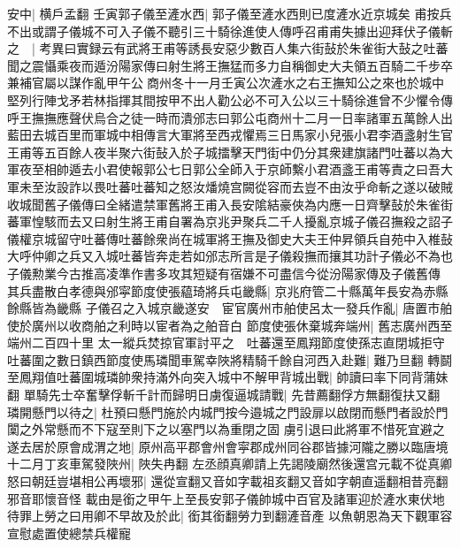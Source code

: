 安中|{
	横戶孟翻}
壬寅郭子儀至滻水西|{
	郭子儀至滻水西則已度滻水近京城矣}
甫按兵不出或謂子儀城不可入子儀不聽引三十騎徐進使人傳呼召甫甫失據出迎拜伏子儀斬之　|{
	考異曰實録云有武將王甫等誘長安惡少數百人集六街鼔於朱雀街大鼔之吐蕃聞之震懾乘夜而遁汾陽家傳曰射生將王撫猛而多力自稱御史大夫領五百騎二千步卒兼補官屬以謀作亂甲午公商州冬十一月壬寅公次滻水之右王撫知公之來也於城中堅列行陣戈矛若林指揮其間按甲不出人勸公必不可入公以三十騎徐進曾不少懼令傳呼王撫撫應聲伏烏合之徒一時而潰邠志曰郭公屯商州十二月一日率諸軍五萬餘人出藍田去城百里而軍城中相傳言大軍將至西戎懼焉三日馬家小兒張小君李酒盞射生官王甫等五百餘人夜半聚六街鼔入於子城擂擊天門街中仍分其衆建旗諸門吐蕃以為大軍夜至相帥遁去小君使報郭公七日郭公全師入于京師繫小君酒盞王甫等責之曰吾大軍未至汝設詐以畏吐蕃吐蕃知之怒汝燔燒宫闕從容而去豈不由汝乎命斬之遂以破賊收城聞舊子儀傳曰全緒遣禁軍舊將王甫入長安隂結豪俠為内應一日齊擊鼔於朱雀街蕃軍惶駭而去又曰射生將王甫自署為京兆尹聚兵二千人擾亂京城子儀召撫殺之詔子儀權京城留守吐蕃傳吐蕃餘衆尚在城軍將王撫及御史大夫王仲昇領兵自苑中入椎鼔大呼仲卿之兵又入城吐蕃皆奔走若如邠志所言是子儀殺撫而攘其功計子儀必不為也子儀勲業今古推高凌準作書多攻其短疑有宿嫌不可盡信今從汾陽家傳及子儀舊傳}
其兵盡散白孝德與邠寜節度使張藴琦將兵屯畿縣|{
	京兆府管二十縣萬年長安為赤縣餘縣皆為畿縣}
子儀召之入城京畿遂安　宦官廣州市舶使呂太一發兵作亂|{
	唐置市舶使於廣州以收商舶之利時以宦者為之舶音白}
節度使張休棄城奔端州|{
	舊志廣州西至端州二百四十里}
太一縱兵焚掠官軍討平之　吐蕃還至鳳翔節度使孫志直閉城拒守吐蕃圍之數日鎮西節度使馬璘聞車駕幸陜將精騎千餘自河西入赴難|{
	難乃旦翻}
轉鬬至鳳翔值吐蕃圍城璘帥衆持滿外向突入城中不解甲背城出戰|{
	帥讀曰率下同背蒲妹翻}
單騎先士卒奮擊俘斬千計而歸明日虜復逼城請戰|{
	先昔薦翻俘方無翻復扶又翻}
璘開懸門以待之|{
	杜預曰懸門施於内城門按今邉城之門設扉以啟閉而懸門者設於門闑之外常懸而不下寇至則下之以塞門以為重閉之固}
虜引退曰此將軍不惜死宜避之遂去居於原會成渭之地|{
	原州高平郡會州會寜郡成州同谷郡皆據河隴之勝以臨唐境}
十二月丁亥車駕發陜州|{
	陜失冉翻}
左丞顔真卿請上先謁陵廟然後還宫元載不從真卿怒曰朝廷豈堪相公再壞邪|{
	還從宣翻又音如字載祖亥翻又音如字朝直遥翻相昔亮翻邪音耶懷音怪}
載由是銜之甲午上至長安郭子儀帥城中百官及諸軍迎於滻水東伏地待罪上勞之曰用卿不早故及於此|{
	銜其銜翻勞力到翻滻音產}
以魚朝恩為天下觀軍容宣慰處置使總禁兵權寵


